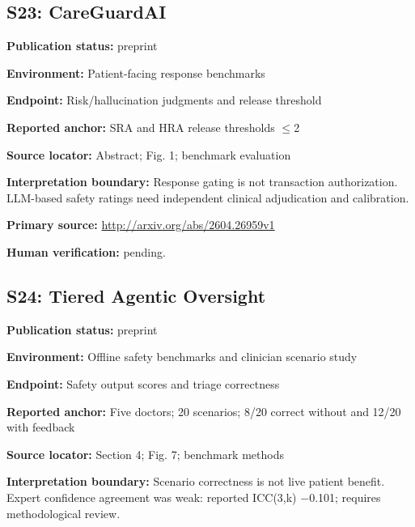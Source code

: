 \documentclass[journal,onecolumn,10pt]{IEEEtran}
\begin{document}
\subsection*{S23: CareGuardAI}

\noindent\textbf{Publication status:} preprint\par

\noindent\textbf{Environment:} Patient-facing response benchmarks\par

\noindent\textbf{Endpoint:} Risk/hallucination judgments and release threshold\par

\noindent\textbf{Reported anchor:} SRA and HRA release thresholds $\leq$2\par

\noindent\textbf{Source locator:} Abstract; Fig. 1; benchmark evaluation\par

\noindent\textbf{Interpretation boundary:} Response gating is not transaction authorization. LLM-based safety ratings need independent clinical adjudication and calibration.\par

\noindent\textbf{Primary source:} \url{http://arxiv.org/abs/2604.26959v1}\par
\noindent\textbf{Human verification:} pending.

\subsection*{S24: Tiered Agentic Oversight}

\noindent\textbf{Publication status:} preprint\par

\noindent\textbf{Environment:} Offline safety benchmarks and clinician scenario study\par

\noindent\textbf{Endpoint:} Safety output scores and triage correctness\par

\noindent\textbf{Reported anchor:} Five doctors; 20 scenarios; 8/20 correct without and 12/20 with feedback\par

\noindent\textbf{Source locator:} Section 4; Fig. 7; benchmark methods\par

\noindent\textbf{Interpretation boundary:} Scenario correctness is not live patient benefit. Expert confidence agreement was weak: reported ICC(3,k) $-$0.101; requires methodological review.\par
\end{document}
